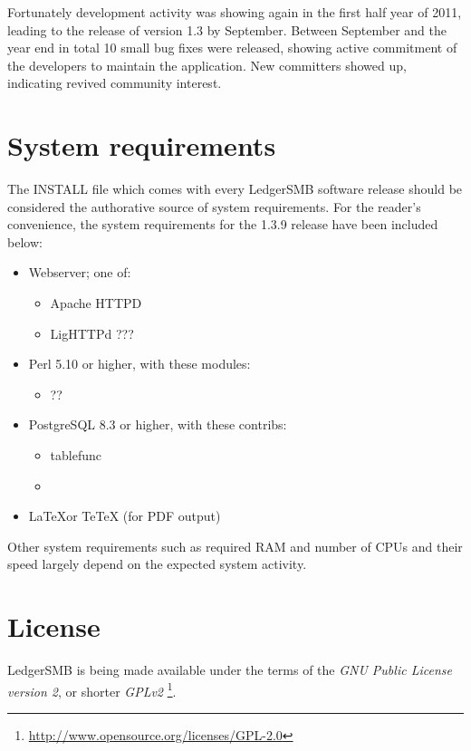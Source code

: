 Fortunately development activity was showing again in the first half 
year of 2011,
leading to the release of version 1.3 by September.  Between September and the
year end in total 10 small bug fixes were released, showing active commitment
of the developers to maintain the application.  New committers showed up, indicating
revived community interest.



\section{System requirements}

The INSTALL file which comes with every LedgerSMB software release should be
considered the authorative source of system requirements.  For the reader's
convenience, the system requirements for the 1.3.9 release have been included
below:

\begin{itemize}
\item Webserver; one of:
\begin{itemize}
\item Apache HTTPD %
\item LigHTTPd ???
\end{itemize}
\item Perl 5.10 or higher, with these modules: 
\begin{itemize}
\item ??
\end{itemize}
\item PostgreSQL 8.3 or higher, with these contribs:
\begin{itemize}
\item tablefunc
\item 
\end{itemize}
\item \LaTeX or TeTeX (for PDF output)
\end{itemize}

Other system requirements such as required RAM and number of CPUs and their speed
largely depend on the expected system activity.

\section{License}

LedgerSMB is being made available under the terms of the
\textit{GNU Public License version 2}, or shorter \textit{GPLv2}
\footnote{\url{http://www.opensource.org/licenses/GPL-2.0}}.

